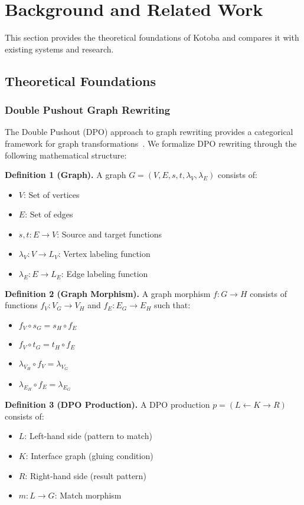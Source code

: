 \documentclass[11pt,a4paper]{article}
\begin{document}
\section{Background and Related Work}
\label{sec:background}

This section provides the theoretical foundations of Kotoba and compares it with existing systems and research.

\subsection{Theoretical Foundations}
\label{subsec:theory}

\subsubsection{Double Pushout Graph Rewriting}
\label{subsubsec:dpo}

The Double Pushout (DPO) approach to graph rewriting provides a categorical framework for graph transformations~\cite{ehrig1973}. We formalize DPO rewriting through the following mathematical structure:

\textbf{Definition 1 (Graph).} A graph $G = (V, E, s, t, \lambda_V, \lambda_E)$ consists of:
\begin{itemize}
\item $V$: Set of vertices
\item $E$: Set of edges
\item $s, t: E \rightarrow V$: Source and target functions
\item $\lambda_V: V \rightarrow L_V$: Vertex labeling function
\item $\lambda_E: E \rightarrow L_E$: Edge labeling function
\end{itemize}

\textbf{Definition 2 (Graph Morphism).} A graph morphism $f: G \rightarrow H$ consists of functions $f_V: V_G \rightarrow V_H$ and $f_E: E_G \rightarrow E_H$ such that:
\begin{itemize}
\item $f_V \circ s_G = s_H \circ f_E$
\item $f_V \circ t_G = t_H \circ f_E$
\item $\lambda_{V_H} \circ f_V = \lambda_{V_G}$
\item $\lambda_{E_H} \circ f_E = \lambda_{E_G}$
\end{itemize}

\textbf{Definition 3 (DPO Production).} A DPO production $p = (L \leftarrow K \rightarrow R)$ consists of:
\begin{itemize}
\item $L$: Left-hand side (pattern to match)
\item $K$: Interface graph (gluing condition)
\item $R$: Right-hand side (result pattern)
\item $m: L \rightarrow G$: Match morphism
\end{itemize}
\end{document}
